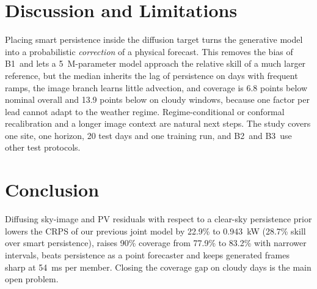 \documentclass[conference]{IEEEtran}
\newcommand{\BOne}{B1}
\newcommand{\BTwo}{B2}
\newcommand{\BThree}{B3}
\begin{document}
\section{Discussion and Limitations}
Placing smart persistence inside the diffusion target turns the generative model into a probabilistic \emph{correction} of a physical forecast. This removes the bias of \BOne\ and lets a \SI{5}{M}-parameter model approach the relative skill of a much larger reference, but the median inherits the lag of persistence on days with frequent ramps, the image branch learns little advection, and coverage is 6.8 points below nominal overall and 13.9 points below on cloudy windows, because one factor per lead cannot adapt to the weather regime. Regime-conditional or conformal recalibration and a longer image context are natural next steps. The study covers one site, one horizon, 20 test days and one training run, and \BTwo\ and \BThree\ use other test protocols.

\section{Conclusion}
Diffusing sky-image and PV residuals with respect to a clear-sky persistence prior lowers the CRPS of our previous joint model by 22.9\% to \SI{0.943}{kW} (28.7\% skill over smart persistence), raises 90\% coverage from 77.9\% to 83.2\% with narrower intervals, beats persistence as a point forecaster and keeps generated frames sharp at \SI{54}{ms} per member. Closing the coverage gap on cloudy days is the main open problem.



\end{document}
